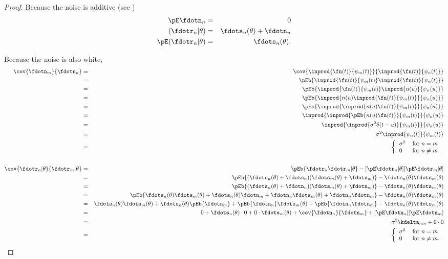 \begin{proof}
Because the noise is additive (see )
\begin{eqnarray*}
   \pE\fdotn_{n}           &=& 0  \\
   (\fdotr_n |\theta)      &=& \fdots_n(\theta)  + \fdotn_n \\
   \pE({\fdotr_n} | \theta) &=& \fdots_n(\theta).
\end{eqnarray*}

Because the noise is also white,
\begin{eqnarray*}
   \cov{\fdotn_m}{\fdotn_n}
      &=& \cov{\inprod{\fn(t)}{\psi_m(t)}}{\inprod{\fn(t)}{\psi_n(t)}}
    \\&=& \pEb{\inprod{\fn(t)}{\psi_m(t)} \inprod{\fn(t)}{\psi_n(t)}}
    \\&=& \pEb{\inprod{\fn(t)}{\psi_m(t)} \inprod{n(u)}{\psi_n(u)}}
    \\&=& \pEb{ \inprod{n(u)\inprod{\fn(t)}{\psi_m(t)}}{\psi_n(u)}}
    \\&=& \pEb{ \inprod{\inprod{n(u)\fn(t)}{\psi_m(t)}}{\psi_n(u)}}
    \\&=& \inprod{\inprod{\pEb{ n(u)\fn(t)}}{\psi_m(t)}}{\psi_n(u)}
    \\&=& \inprod{\inprod{\sigma^2 \delta(t-u)}{\psi_m(t)}}{\psi_n(u)}
    \\&=& \sigma^2 \inprod{\psi_n(t)}{\psi_m(t)}
    \\&=& \left\{
          \begin{tabular}{ll}
             $\sigma^2$ & for $n=m$ \\
             $0$   & for $n\ne m$.
          \end{tabular}
          \right.
\\ 
\\
   \cov{\fdotr_n|\theta}{\fdotr_m|\theta }
      &=& \pEb{\fdotr_n \fdotr_m |\theta} - [\pE\fdotr_n|\theta][\pE\fdotr_m|\theta ]
    \\&=& \pEb{(\fdots_n(\theta) +\fdotn_n)(\fdots_m(\theta) +\fdotn_m)} - \fdots_n(\theta) \fdots_m(\theta)
    \\&=& \pEb{(\fdots_n(\theta) +\fdotn_n)(\fdots_m(\theta) +\fdotn_m)} - \fdots_n(\theta) \fdots_m(\theta) 
    \\&=& \pEb{\fdots_n(\theta) \fdots_m(\theta) +\fdots_n(\theta) \fdotn_m+ \fdotn_n\fdots_m(\theta) +\fdotn_n\fdotn_m } - \fdots_n(\theta) \fdots_m(\theta) 
    \\&=& \fdots_n(\theta) \fdots_m(\theta) + \fdots_n(\theta) \pEb{\fdotn_m}+ \pEb{\fdotn_n}\fdots_m(\theta) +\pEb{\fdotn_n\fdotn_m}  - \fdots_n(\theta) \fdots_m(\theta) 
    \\&=& 0 + \fdots_n(\theta) \cdot0 + 0\cdot\fdots_m(\theta) + \cov{\fdotn_n}{\fdotn_m}+[\pE\fdotn_n][\pE\fdotn_m]
    \\&=& \sigma^2 \kdelta_{nm} + 0\cdot0
    \\&=& \left\{
          \begin{tabular}{ll}
             $\sigma^2$ & for $n=m$ \\
             $0$   & for $n\ne m$.
          \end{tabular}
          \right.
\end{eqnarray*}
\end{proof}


